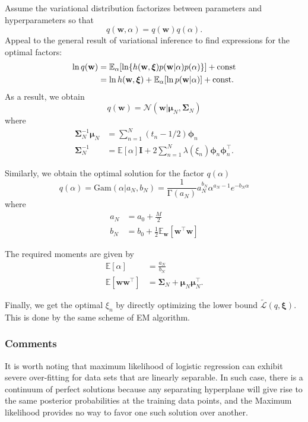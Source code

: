 \documentclass[a4paper]{book}
\newcommand{\up}{\mathrm}
\renewcommand{\bf}{\mathbf}
\renewcommand{\cal}{\mathcal}
\newcommand{\bb}{\mathbb}
\newcommand{\bs}{\boldsymbol}
\begin{document}
Assume the variational distribution factorizes between parameters and hyperparameters so that
\begin{equation}
	q(\bf{w},\alpha) = q(\bf{w})q(\alpha).
\end{equation}
Appeal to the general result of variational inference to find expressions for the optimal factors:
\begin{align}
	\ln q(\bf{w}) &= \bb{E}_{\alpha} [\ln \{ h(\bf{w},\bs{\xi})p(\bf{w}|\alpha)p(\alpha) \}] + \up{const} \notag \\
	&= \ln h(\bf{w},\bs{\xi}) + \bb{E}_{\alpha}[ \ln p(\bf{w}|\alpha) ]+ \up{const}.
\end{align}
As a result, we obtain
\begin{equation}
	q(\bf{w}) = \cal{N}(\bf{w}|\bs{\mu}_N,\bs{\Sigma}_N)
\end{equation}
where
\begin{align}
	\bs{\Sigma}_N^{-1} \bs{\mu}_N &= \sum_{n=1}^N (t_n -1/2) \bs{\phi}_n \\
	\bs{\Sigma}_N^{-1} &= \bb{E}[\alpha] \bf{I} + 2 \sum_{n=1}^N \lambda(\xi_n)\bs{\phi}_n \bs{\phi}_n^{\intercal}.
\end{align}

Similarly, we obtain the optimal solution for the factor $q(\alpha)$
\begin{equation}
	q(\alpha) = \up{Gam}(\alpha|a_N,b_N) = \frac{1}{\up{\Gamma}(a_N)}a_N^{b_N}\alpha^{a_N-1}e^{-b_N\alpha} 
\end{equation}
where
\begin{align}
	a_N &= a_0 + \frac{M}{2} \\
	b_N &= b_0 + \frac{1}{2} \bb{E}_{\bf{w}}[\bf{w}^{\intercal} \bf{w}]
\end{align}

The required moments are given by
\begin{align}
	\bb{E}[\alpha] &= \frac{a_N}{b_N} \\
	\bb{E}[\bf{w}\bf{w}^{\intercal}] &= \bs{\Sigma}_N + \bs{\mu}_N \bs{\mu}_N^{\intercal}.
\end{align}

Finally, we get the optimal $\xi_n$ by directly optimizing the lower bound $\tilde{\cal{L}}(q,\bs{\xi})$. This is done by the same scheme of EM algorithm.
\subsubsection{Comments}
It is worth noting that maximum likelihood of logistic regression can exhibit severe over-fitting for data sets that are linearly separable. In such case, there is a continuum of perfect solutions because any separating hyperplane will give rise to the same posterior probabilities at the training data points, and the Maximum likelihood provides no way to favor one such solution over another.
\end{document}
